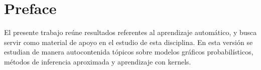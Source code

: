 %

\chapter*{Preface}

El presente trabajo reúne resultados referentes al aprendizaje automático,
y busca servir como material de apoyo en el estudio de esta disciplina. En esta versión se estudian de manera autocontenida tópicos sobre modelos
gráficos probabilísticos, métodos de inferencia aproximada y aprendizaje con
kernels.


